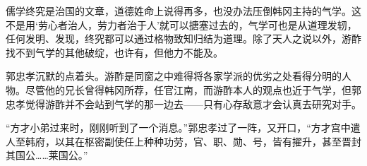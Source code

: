 儒学终究是治国的文章，道德姓命上说得再多，也没办法压倒韩冈主持的气学。这不是用‘劳心者治人，劳力者治于人’就可以搪塞过去的，气学可也是从道理发轫，任何发明、发现，终究都可以通过格物致知归结为道理。除了天人之说以外，游酢找不到气学的其他破绽，也许有，但他力不能及。

郭忠孝沉默的点着头。游酢是同窗之中难得将各家学派的优劣之处看得分明的人物。尽管他的兄长曾得韩冈所荐，任官江南，而游酢本人的观点也近于气学，但郭忠孝觉得游酢并不会站到气学的那一边去——只有心存敌意才会认真去研究对手。

“方才小弟过来时，刚刚听到了一个消息。”郭忠孝过了一阵，又开口，“方才宫中遣人至韩府，以其在枢密副使任上种种功劳，官、职、勋、号，皆有擢升，甚至晋封其国公……莱国公。”

